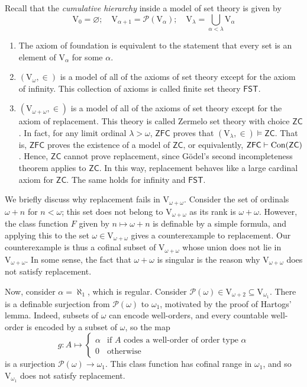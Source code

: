 Recall that the \emph{cumulative hierarchy} inside a model of set theory is given by
\[ \mathrm{V}_0 = \varnothing;\quad \mathrm{V}_{\alpha + 1} = \mathcal P(\mathrm{V}_\alpha);\quad \mathrm{V}_\lambda = \bigcup_{\alpha < \lambda} \mathrm{V}_\alpha \]
\begin{enumerate}
    \item The axiom of foundation is equivalent to the statement that every set is an element of \( \mathrm{V}_\alpha \) for some \( \alpha \).
    \item \( (\mathrm{V}_\omega, \in) \) is a model of all of the axioms of set theory except for the axiom of infinity.
    This collection of axioms is called finite set theory \( \mathsf{FST} \).
    \item \( (\mathrm{V}_{\omega + \omega}, \in) \) is a model of all of the axioms of set theory except for the axiom of replacement.
    This theory is called Zermelo set theory with choice \( \mathsf{ZC} \).
    In fact, for any limit ordinal \( \lambda > \omega \), \( \mathsf{ZFC} \) proves that \( (\mathrm{V}_\lambda, \in) \vDash \mathsf{ZC} \).
    That is, \( \mathsf{ZFC} \) proves the existence of a model of \( \mathsf{ZC} \), or equivalently, \( \mathsf{ZFC} \vdash \operatorname{Con}(\mathsf{ZC}) \).
    Hence, \( \mathsf{ZC} \) cannot prove replacement, since G\"odel's second incompleteness theorem applies to \( \mathsf{ZC} \).
    In this way, replacement behaves like a large cardinal axiom for \( \mathsf{ZC} \).
    The same holds for infinity and \( \mathsf{FST} \).
\end{enumerate}
We briefly discuss why replacement fails in \( \mathrm{V}_{\omega + \omega} \).
Consider the set of ordinals \( \omega + n \) for \( n < \omega \); this set does not belong to \( \mathrm{V}_{\omega + \omega} \) as its rank is \( \omega + \omega \).
However, the class function \( F \) given by \( n \mapsto \omega + n \) is definable by a simple formula, and applying this to the set \( \omega \in \mathrm{V}_{\omega + \omega} \) gives a counterexample to replacement.
Our counterexample is thus a cofinal subset of \( \mathrm{V}_{\omega + \omega} \) whose union does not lie in \( \mathrm{V}_{\omega + \omega} \).
In some sense, the fact that \( \omega + \omega \) is singular is the reason why \( \mathrm{V}_{\omega + \omega} \) does not satisfy replacement.

Now, consider \( \alpha = \aleph_1 \), which is regular.
Consider \( \mathcal P(\omega) \in \mathrm{V}_{\omega + 2} \subseteq \mathrm{V}_{\omega_1} \).
There is a definable surjection from \( \mathcal P(\omega) \) to \( \omega_1 \), motivated by the proof of Hartogs' lemma.
Indeed, subsets of \( \omega \) can encode well-orders, and every countable well-order is encoded by a subset of \( \omega \), so the map
\[ g : A \mapsto \begin{cases}
    \alpha & \text{if } A \text{ codes a well-order of order type } \alpha \\
    0 & \text{otherwise}
\end{cases} \]
is a surjection \( \mathcal P(\omega) \to \omega_1 \).
This class function has cofinal range in \( \omega_1 \), and so \( \mathrm{V}_{\omega_1} \) does not satisfy replacement.

